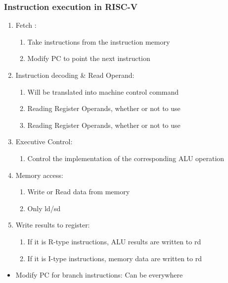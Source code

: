 \subsubsection{Instruction execution in RISC-V}
\begin{enumerate}
    \item Fetch :
    \begin{enumerate}
        \item\small Take instructions from the instruction memory
        \item\small Modify PC to point the next instruction
    \end{enumerate}
    \item Instruction decoding \& Read Operand:
    \begin{enumerate}
        \item\small Will be translated into machine control command
        \item\small Reading Register Operands, whether or not to use
        \item\small Reading Register Operands, whether or not to use
    \end{enumerate}
    \item Executive Control:
    \begin{enumerate}
        \item\small Control the implementation of the corresponding ALU operation
    \end{enumerate}
    \item Memory access:
    \begin{enumerate}
        \item\small Write or Read data from memory
        \item\small Only ld/sd
    \end{enumerate}
    \item Write results to register:
    \begin{enumerate}
        \item\small If it is R-type instructions, ALU results are written to rd
        \item\small If it is I-type instructions, memory data are written to rd
    \end{enumerate}
\end{enumerate}
\begin{itemize}
    \item Modify PC for branch instructions: \small Can be everywhere
\end{itemize}

